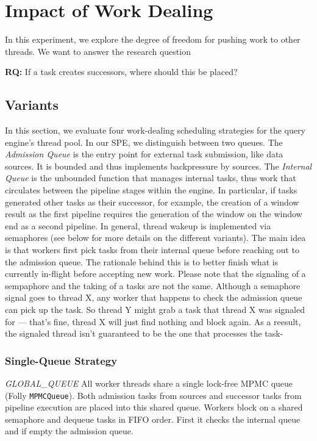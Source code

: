 \section{Impact of Work Dealing}
In this experiment, we explore the degree of freedom for pushing work to other threads. We want to answer the research question

\begin{tcolorbox}[colback=blue!5, colframe=blue!40!black, title=Research Questions]
    \textbf{RQ:} If a task creates successors, where should this be placed?
\end{tcolorbox}


\subsection{Variants}
In this section, we evaluate four work-dealing scheduling strategies for the query engine's thread pool.
In our SPE, we distinguish between two queues.
The \textit{Admission Queue} is the entry point for external task submission, like data sources. It is bounded and thus implements backpressure by sources. 
The \textit{Internal Queue} is the unbounded function that manages internal tasks, thus work that circulates between the pipeline stages within the engine. 
In particular, if tasks generated other tasks as their successor, for example, the creation of a window result as the first pipeline requires the generation of the window on the window end as a second pipeline.
In general, thread wakeup is implemented via semaphores (see below for more details on the different variants). The main idea is that workers first pick tasks from their internal queue before reaching out to the admission queue. The rationale behind this is to better finish what is currently in-flight before accepting new work.
Please note that the signaling of a sempaphore and the taking of a tasks are not the same. Although a semaphore signal goes to thread X, any worker that happens to check the admission queue can pick up the task. So thread Y might grab a task that thread X was signaled for — that's fine, thread X will just find nothing and block again. As a reesult, the signaled thread isn't guaranteed to be the one that processes the task-


\subsubsection{Single-Queue Strategy}
\textit{GLOBAL\_QUEUE}
All worker threads share a single lock-free MPMC queue (Folly \texttt{MPMCQueue}).
Both admission tasks from sources and successor tasks from pipeline execution are placed into this shared queue.
Workers block on a shared semaphore and dequeue tasks in FIFO order. First it checks the internal queue and if empty the admission queue. 

